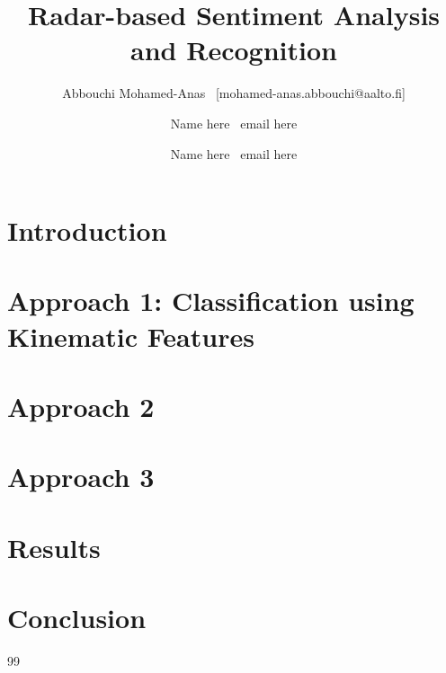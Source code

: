\documentclass{article}
\title{Radar-based Sentiment Analysis and Recognition}
\author{
Abbouchi Mohamed-Anas \
[mohamed-anas.abbouchi@aalto.fi]
\and
Name here \
email here
\and
Name here \
email here
}
\date{}
\begin{document}
\maketitle

\begin{abstract}

\end{abstract}

\section{Introduction}

\section{Approach 1: Classification using Kinematic Features}

\section{Approach 2}

\section{Approach 3}

\section{Results}

\section{Conclusion}



\begin{thebibliography}{99}

\end{thebibliography}
\end{document}
